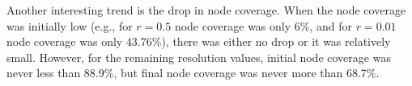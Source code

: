 \documentclass[11pt]{article}   	%
\begin{document}
Another interesting trend is the drop in node coverage.
When the node coverage was initially low (e.g., for $r=0.5$ node coverage was only 6\%, and for $r=0.01$ node coverage was only 43.76\%), there was either no drop or it was relatively small.
However, for the remaining resolution values, initial node coverage was never less than 88.9\%, but final node coverage was
 never more than 68.7\%.
\end{document}
